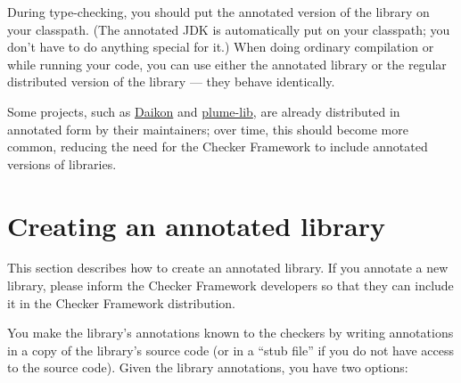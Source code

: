 During type-checking, you should put the annotated version of the library on
your classpath.  (The annotated JDK is automatically put on your classpath;
you don't have to
do anything special for it.)
When doing ordinary compilation or while running your code,
you can use either the annotated
library or the regular distributed version of the library --- they
behave identically.

%
%

Some projects, such as
  \href{http://plse.cs.washington.edu/daikon/}{Daikon}
  and
  \href{http://mernst.github.io/plume-lib/}{plume-lib},
are already distributed in annotated form by their maintainers;
over time, this should become more common, reducing the need for the
Checker Framework to include annotated versions of libraries.


\section{Creating an annotated library\label{annotated-libraries-creating}}

This section describes how to create an annotated library.
If you annotate a new library, please inform the Checker Framework
developers so that they can include it in the Checker Framework distribution.

You make the library's annotations known to the checkers by writing
annotations in a copy of the library's source code (or in a ``stub
file'' if you do not have access to the source code).
Given the library annotations, you have two options:

